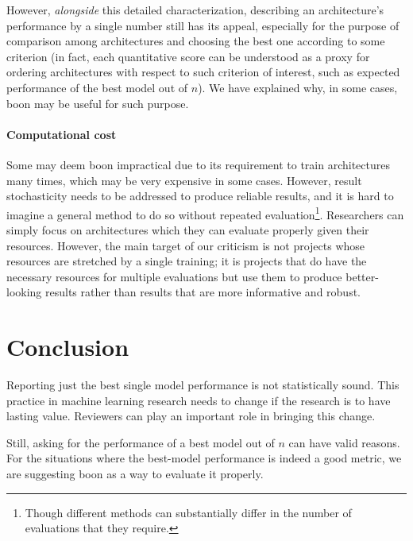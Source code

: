 \documentclass{article}
\newcommand{\tboon}{\gls{boon}\xspace}
\begin{document}
However, \emph{alongside} this detailed characterization, describing an architecture's performance by a single number still has its appeal, especially for the purpose of comparison among architectures and choosing the best one according to some criterion (in fact, each quantitative score can be understood as a proxy for ordering architectures with respect to such criterion of interest, such as expected performance of the best model out of $n$). We have explained why, in some cases, \tboon may be useful for such purpose. 

\paragraph{Computational cost} Some may deem \tboon impractical due to its requirement to train architectures many times, which may be very expensive in some cases. However, result stochasticity needs to be addressed to produce reliable results, and it is hard to imagine a general method to do so without repeated evaluation\footnote{Though different methods can substantially differ in the number of evaluations that they require.}. Researchers can simply focus on architectures which they can evaluate properly given their resources. However, the main target of our criticism is not projects whose resources are stretched by a single training; it is projects that do have the necessary resources for multiple evaluations but use them to produce better-looking results rather than results that are more informative and robust.


\section{Conclusion}
Reporting just the best single model performance is not statistically sound. This practice in machine learning research needs to change if the research is to have lasting value. Reviewers can play an important role in bringing this change.

Still, asking for the performance of a best model out of $n$ can have valid reasons. For the situations where the best-model performance is indeed a good metric, we are suggesting \tboon as a way to evaluate it properly. 

\vskip 0.1in







\end{document}
